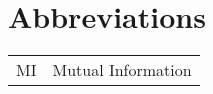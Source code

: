 
\chapter{Abbreviations}

\todo{}

\begin{tabularx}{\textwidth}{ l X }
MI & Mutual Information \dotfill  \pageref{ntn:MI}\\
\end{tabularx}

